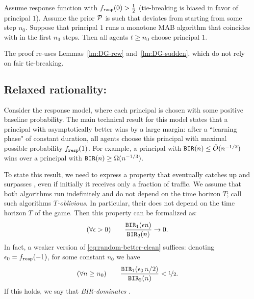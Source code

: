 

\begin{theorem}\label{thm:HardMax-biased}
Assume \HardMax response function with $f_{\mathtt{resp}}(0)>\tfrac12$ (\ie tie-breaking is biased in favor of principal $1$). Assume the prior $\mathcal{P}$ is such that \DynGreedy deviates from \StaticGreedy starting from some step $n_0$. Suppose that principal $1$ runs a monotone MAB algorithm that coincides with \DynGreedy in the first $n_0$ steps. Then all agents $t\geq n_0$ choose principal $1$.
\end{theorem}

The proof re-uses Lemmas~\ref{lm:DG-rew} and~\ref{lm:DG-sudden}, which do not rely on fair tie-breaking. 



\subsection{Relaxed rationality: \HardMaxRandom}
\label{sec:theory-HMR}

Consider the \HardMaxRandom response model, where each principal is chosen with some positive baseline probability. The main technical result for this model states that a principal with asymptotically better \BIR wins by a large margin: after a ``learning phase" of constant duration, all agents choose this principal with maximal possible probability $f_{\mathtt{resp}}(1)$. For example, a principal with $\mathtt{BIR}(n)\leq \tilde{O}(n^{-1/2})$ wins over a principal with $\mathtt{BIR}(n)\geq \Omega(n^{-1/3})$.



To state this result, we need to express a property that \alg[1] eventually catches up and surpasses \alg[2], even if initially it receives only a fraction of traffic. We assume that both algorithms run indefinitely and do not depend on the time horizon $T$; call such algorithms \emph{$T$-oblivious}. In particular, their \BIR does not depend on the time horizon $T$ of the game.  Then this property can be formalized as:
\begin{align}\label{eq:random-better-clean}
(\forall \epsilon>0)\qquad
\frac{\mathtt{BIR}_1(\epsilon n)}{\mathtt{BIR}_2(n)} \to 0.
\end{align}
In fact, a weaker version of \eqref{eq:random-better-clean} suffices:
denoting $\epsilon_0 = f_{\mathtt{resp}}(-1)$, for some constant $n_0$ we have
\begin{align}\label{eq:random-better-weaker}
(\forall n\geq n_0) \qquad
\frac{\mathtt{BIR}_1(\epsilon_0\, n/2)}{\mathtt{BIR}_2(n)} <\nicefrac12.
\end{align}
If this holds, we say that \alg[1] \emph{BIR-dominates} \alg[2].

